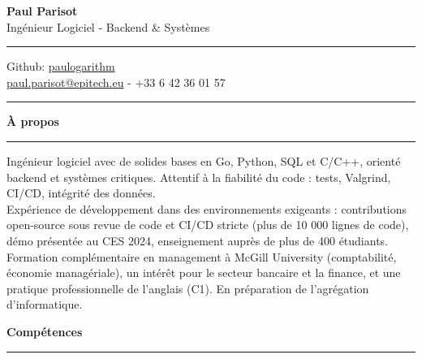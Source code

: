 \documentclass[9pt]{extarticle}
\begin{document}
\begin{center}
	{\huge\bfseries Paul Parisot}
	\\[9pt]
	{\Large Ingénieur Logiciel - Backend \& Systèmes}
	\\
\end{center}

\par\vspace{-5pt}
\rule{\linewidth}{0.4pt}
\par\vspace{-5pt}

\begin{center}
	Github: \href{https://github.com/paulogarithm}{paulogarithm}
	\\
	\href{mailto:paul.parisot@epitech.eu}{paul.parisot@epitech.eu} - +33 6 42 36 01 57
	\\
\end{center}

\par\vspace{-10pt}
\rule{\linewidth}{0.4pt}
\par\vspace{7pt}

{\large\bfseries À propos}
\par\vspace{-8pt}
\rule{\linewidth}{0.4pt}
\par\vspace{5pt}

Ingénieur logiciel avec de solides bases en Go, Python, SQL et C/C++, orienté backend et systèmes critiques. Attentif à la fiabilité du code : tests, Valgrind, CI/CD, intégrité des données.
\\
Expérience de développement dans des environnements exigeants : contributions open-source sous revue de code et CI/CD stricte (plus de 10 000 lignes de code), démo présentée au CES 2024, enseignement auprès de plus de 400 étudiants.
\\
Formation complémentaire en management à McGill University (comptabilité, économie managériale), un intérêt pour le secteur bancaire et la finance, et une pratique professionnelle de l'anglais (C1). En préparation de l'agrégation d'informatique.
\par\vspace{5pt}

{\large\bfseries Compétences}
\par\vspace{-8pt}
\rule{\linewidth}{0.4pt}
\par\vspace{5pt}
\end{document}
